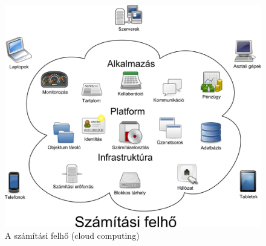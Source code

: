\begin{figure}[h!]
\centering
\includegraphics[width=1.0\textwidth]{figures/Cloud_computing_hu.png}
\caption{A számítási felhő (\foreignlanguage{english}{cloud computing})} \label{fig:cloud_computing_hu}
\end{figure}


